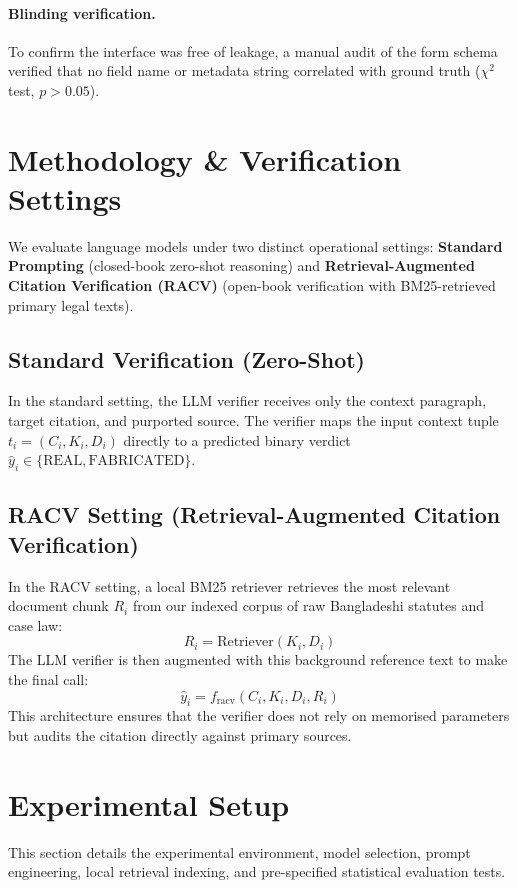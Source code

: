 \documentclass[conference]{IEEEtran}
\begin{document}
\paragraph{Blinding verification.} To confirm the interface was free of leakage, a manual audit of the form schema verified that no field name or metadata string correlated with ground truth ($\chi^2$ test, $p > 0.05$).

\section{Methodology \& Verification Settings}
We evaluate language models under two distinct operational settings: \textbf{Standard Prompting} (closed-book zero-shot reasoning) and \textbf{Retrieval-Augmented Citation Verification (RACV)} (open-book verification with BM25-retrieved primary legal texts).

\subsection{Standard Verification (Zero-Shot)}
In the standard setting, the LLM verifier receives only the context paragraph, target citation, and purported source. The verifier maps the input context tuple $t_i = (C_i, K_i, D_i)$ directly to a predicted binary verdict $\hat{y}_i \in \{\text{REAL}, \text{FABRICATED}\}$.

\subsection{RACV Setting (Retrieval-Augmented Citation Verification)}
In the RACV setting, a local BM25 retriever \cite{bm25} retrieves the most relevant document chunk $R_i$ from our indexed corpus of raw Bangladeshi statutes and case law:
\begin{equation}
R_i = \text{Retriever}(K_i, D_i)
\end{equation}
The LLM verifier is then augmented with this background reference text to make the final call:
\begin{equation}
\hat{y}_i = f_{\text{racv}}(C_i, K_i, D_i, R_i)
\end{equation}
This architecture ensures that the verifier does not rely on memorised parameters but audits the citation directly against primary sources.

\section{Experimental Setup}
This section details the experimental environment, model selection, prompt engineering, local retrieval indexing, and pre-specified statistical evaluation tests.
\end{document}
